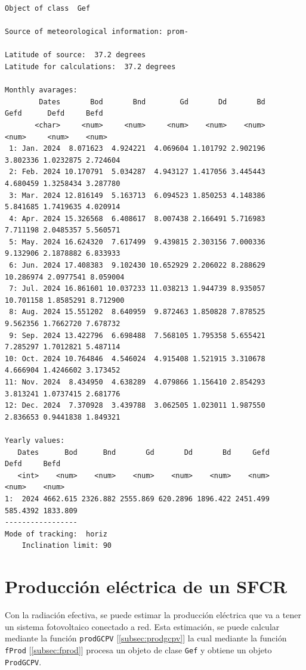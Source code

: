 \begin{verbatim}
Object of class  Gef 

Source of meteorological information: prom- 

Latitude of source:  37.2 degrees
Latitude for calculations:  37.2 degrees

Monthly avarages:
        Dates       Bod       Bnd        Gd       Dd       Bd      Gefd      Defd     Befd
       <char>     <num>     <num>     <num>    <num>    <num>     <num>     <num>    <num>
 1: Jan. 2024  8.071623  4.924221  4.069604 1.101792 2.902196  3.802336 1.0232875 2.724604
 2: Feb. 2024 10.170791  5.034287  4.943127 1.417056 3.445443  4.680459 1.3258434 3.287780
 3: Mar. 2024 12.816149  5.163713  6.094523 1.850253 4.148386  5.841685 1.7419635 4.020914
 4: Apr. 2024 15.326568  6.408617  8.007438 2.166491 5.716983  7.711198 2.0485357 5.560571
 5: May. 2024 16.624320  7.617499  9.439815 2.303156 7.000336  9.132906 2.1878882 6.833933
 6: Jun. 2024 17.408383  9.102430 10.652929 2.206022 8.288629 10.286974 2.0977541 8.059004
 7: Jul. 2024 16.861601 10.037233 11.038213 1.944739 8.935057 10.701158 1.8585291 8.712900
 8: Aug. 2024 15.551202  8.640959  9.872463 1.850828 7.878525  9.562356 1.7662720 7.678732
 9: Sep. 2024 13.422796  6.698488  7.568105 1.795358 5.655421  7.285297 1.7012821 5.487114
10: Oct. 2024 10.764846  4.546024  4.915408 1.521915 3.310678  4.666904 1.4246602 3.173452
11: Nov. 2024  8.434950  4.638289  4.079866 1.156410 2.854293  3.813241 1.0737415 2.681776
12: Dec. 2024  7.370928  3.439788  3.062505 1.023011 1.987550  2.836653 0.9441838 1.849321

Yearly values:
   Dates      Bod      Bnd       Gd       Dd       Bd     Gefd     Defd     Befd
   <int>    <num>    <num>    <num>    <num>    <num>    <num>    <num>    <num>
1:  2024 4662.615 2326.882 2555.869 620.2896 1896.422 2451.499 585.4392 1833.809
-----------------
Mode of tracking:  horiz 
    Inclination limit: 90
\end{verbatim}

\section{Producción eléctrica de un SFCR}
\label{sec:org364602d}
\label{produccion-electrica-sfcr}
Con la radiación efectiva, se puede estimar la producción eléctrica que va a tener un sistema fotovoltaico conectado a red. Esta estimación, se puede calcular mediante la función \texttt{prodGCPV} [\ref{subsec:prodgcpv}] la cual mediante la función \texttt{fProd} [\ref{subsec:fprod}] procesa un objeto de clase \texttt{Gef} y obtiene un objeto \texttt{ProdGCPV}.

